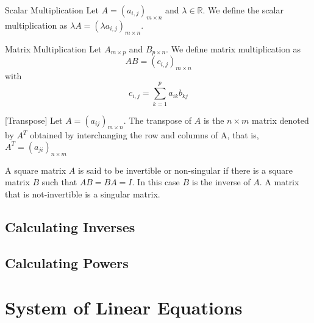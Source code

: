 \documentclass[a4paper]{article}
\begin{document}
\begin{defn}{Scalar Multiplication}{} Let $A=(a_{i,j})_{m\times n}$ and $\lambda\in\mathbb{R}$. We define the scalar multiplication as $\lambda A=(\lambda a_{i,j})_{m\times n}$. 
\end{defn}

\begin{defn}{Matrix Multiplication}{} Let $A_{m\times p}$ and $B_{p\times n}$. We define matrix multiplication as $$AB=(c_{i,j})_{m\times n}$$ with $$c_{i,j}=\sum_{k=1}^pa_{ik}b_{kj}$$
\end{defn}

\begin{defn}{}{}[Transpose] Let $A=(a_{ij})_{m\times n}$.  The transpose of $A$ is the $n\times m$ matrix denoted by $A^T$ obtained by interchanging the row and columns of A, that is, $A^T=(a_{ji})_{n\times m}$
\end{defn}

\begin{defn}{}{} A square matrix $A$ is said to be invertible or non-singular if there is a square matrix $B$ such that $AB=BA=I$. In this case $B$ is the inverse of $A$. A matrix that is not-invertible is a singular matrix. 
\end{defn}

\subsection{Calculating Inverses}

\subsection{Calculating Powers}

\pagebreak
\section{System of Linear Equations}
\end{document}
